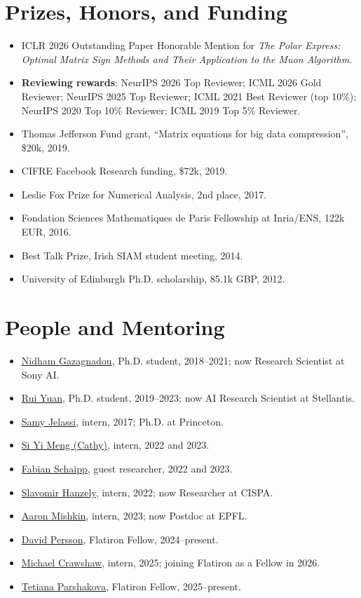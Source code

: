\documentclass[10pt,letterpaper]{article}
\begin{document}
\section{Prizes, Honors, and Funding}
\begin{itemize}
\item ICLR 2026 Outstanding Paper Honorable Mention for \emph{The Polar Express: Optimal Matrix Sign Methods and Their Application to the Muon Algorithm}.
\item \textbf{Reviewing rewards}: NeurIPS 2026 Top Reviewer; ICML 2026 Gold Reviewer; NeurIPS 2025 Top Reviewer; ICML 2021 Best Reviewer (top 10\%); NeurIPS 2020 Top 10\% Reviewer; ICML 2019 Top 5\% Reviewer.
\item Thomas Jefferson Fund grant, ``Matrix equations for big data compression'', \$20k, 2019.
\item CIFRE Facebook Research funding, \$72k, 2019.
\item Leslie Fox Prize for Numerical Analysis, 2nd place, 2017.
\item Fondation Sciences Mathematiques de Paris Fellowship at Inria/ENS, 122k EUR, 2016.
\item Best Talk Prize, Irish SIAM student meeting, 2014.
\item University of Edinburgh Ph.D. scholarship, 85.1k GBP, 2012.
\end{itemize}

\section{People and Mentoring}
\begin{itemize}
\item \href{https://ngazagna.github.io/}{Nidham Gazagnadou}, Ph.D. student, 2018--2021; now Research Scientist at Sony AI.
\item \href{https://rui-yuan91.github.io/}{Rui Yuan}, Ph.D. student, 2019--2023; now AI Research Scientist at Stellantis.
\item \href{https://sjelassi.github.io/}{Samy Jelassi}, intern, 2017; Ph.D. at Princeton.
\item \href{https://www.cs.cornell.edu/~siyimeng/}{Si Yi Meng (Cathy)}, intern, 2022 and 2023.
\item \href{https://fabian-sp.github.io/}{Fabian Schaipp}, guest researcher, 2022 and 2023.
\item \href{https://cispa.de/en/people/c01slha}{Slavomir Hanzely}, intern, 2022; now Researcher at CISPA.
\item \href{https://cs.stanford.edu/~amishkin/}{Aaron Mishkin}, intern, 2023; now Postdoc at EPFL.
\item \href{https://davpersson.github.io/}{David Persson}, Flatiron Fellow, 2024--present.
\item \href{https://mtcrawshaw.github.io/}{Michael Crawshaw}, intern, 2025; joining Flatiron as a Fellow in 2026.
\item \href{https://parshakova.github.io/}{Tetiana Parshakova}, Flatiron Fellow, 2025--present.
\end{itemize}
\end{document}
